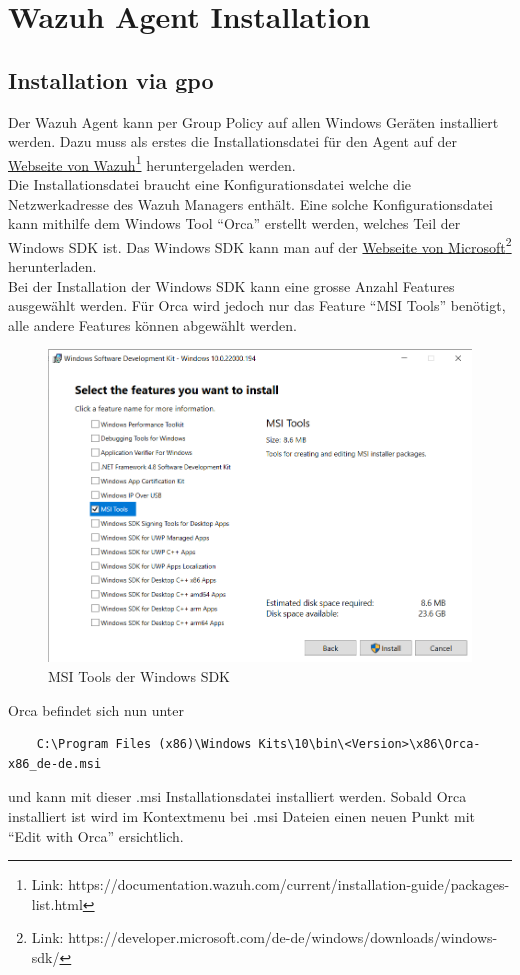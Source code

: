 \chapter{Wazuh Agent Installation}

\section{Installation via \acrshort{gpo}}
Der Wazuh Agent kann per Group Policy auf allen Windows Geräten installiert werden.
Dazu muss als erstes die Installationsdatei für den Agent auf der \href{https://documentation.wazuh.com/current/installation-guide/packages-list.html}{Webseite von Wazuh}\footnote{Link: https://documentation.wazuh.com/current/installation-guide/packages-list.html} heruntergeladen werden.\\

Die Installationsdatei braucht eine Konfigurationsdatei welche die Netzwerkadresse des Wazuh Managers enthält.
Eine solche Konfigurationsdatei kann mithilfe dem Windows Tool ``Orca'' erstellt werden, welches Teil der Windows SDK ist. Das Windows SDK kann man auf der \href{https://developer.microsoft.com/de-de/windows/downloads/windows-sdk/}{Webseite von Microsoft}\footnote{Link: https://developer.microsoft.com/de-de/windows/downloads/windows-sdk/} herunterladen.\\

Bei der Installation der Windows SDK kann eine grosse Anzahl Features ausgewählt werden.
Für Orca wird jedoch nur das Feature ``MSI Tools'' benötigt, alle andere Features können abgewählt werden.
\begin{figure}[H]
    \centering
    \includegraphics[width=0.7\linewidth]{../img/agent/install-sdk.png}
    \caption{MSI Tools der Windows SDK}
\end{figure}

Orca befindet sich nun unter
\begin{lstlisting}
    C:\Program Files (x86)\Windows Kits\10\bin\<Version>\x86\Orca-x86_de-de.msi
\end{lstlisting}
und kann mit dieser .msi Installationsdatei installiert werden.
Sobald Orca installiert ist wird im Kontextmenu bei .msi Dateien einen neuen Punkt mit ``Edit with Orca'' ersichtlich.\\

